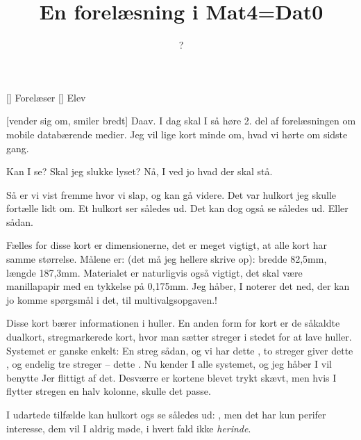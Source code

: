 \documentclass[a4paper,11pt]{article}
\title{En forelæsning i Mat4=Dat0}
\author{?}
\begin{document}
\maketitle

\begin{roles}
[] Forelæser
[] Elev
\end{roles}

\begin{sketch}

[vender sig om, smiler bredt] Daav.  I dag skal I så høre
2. del af forelæsningen om mobile databærende medier.  Jeg vil lige
kort minde om, hvad vi hørte om sidste gang.


 Kan I se?  Skal jeg slukke lyset?  Nå, I ved jo hvad der skal
stå.


 Så er vi vist fremme hvor vi slap, og kan gå videre.  Det var
hulkort jeg skulle fortælle lidt om.  Et hulkort ser således ud.
 Det kan dog også se således ud.
 Eller sådan. 

 Fælles for disse kort er dimensionerne, det er meget vigtigt,
at alle kort har samme størrelse.  Målene er: (det må jeg hellere
skrive op): bredde 82,5mm, længde 187,3mm.  Materialet er naturligvis
også vigtigt, det skal være manillapapir med en tykkelse på 0,175mm.
Jeg håber, I noterer det ned, der kan jo komme spørgsmål i det, til
multivalgsopgaven.!

 Disse kort bærer informationen i huller.  En anden form for
kort er de såkaldte dualkort, stregmarkerede kort, hvor man sætter
streger i stedet for at lave huller.  Systemet er ganske enkelt: En
streg sådan, og vi har dette , to streger giver dette
, og endelig tre streger -- dette
.  Nu kender I alle systemet, og jeg håber I vil
benytte Jer flittigt af det.  Desværre er kortene blevet trykt skævt,
men hvis I flytter stregen en halv kolonne, skulle det passe.

 I udartede tilfælde kan hulkort ogs se således ud:
, men det har kun perifer interesse,
dem vil I aldrig møde, i hvert fald ikke {\em herinde}.


\end{sketch}
\end{document}
